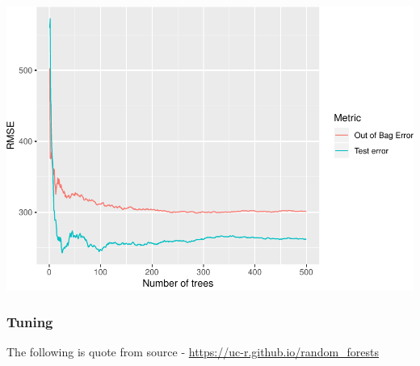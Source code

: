 \documentclass[]{article}
\begin{document}
\includegraphics{HW7_files/figure-latex/unnamed-chunk-12-1.pdf}

\subsubsection{Tuning}\label{tuning}

The following is quote from source -
\url{https://uc-r.github.io/random_forests}
\end{document}
